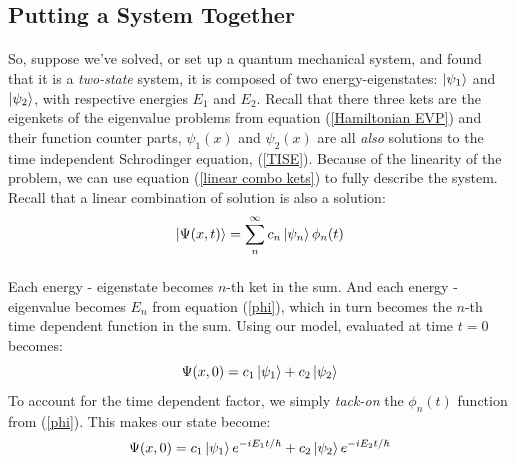 \documentclass[12pt,letterpaper]{book}
\begin{document}

\subsection*{Putting a System Together}
\paragraph*{}So, suppose we've solved, or set up a quantum mechanical system, and found that it is a \textit{two-state} system, it is composed of two energy-eigenstates: 
$\ket{\psi_1}$ and $\ket{\psi_2}$, with respective energies $E_1$ and $E_2$.  Recall that there three kets are the eigenkets of the eigenvalue problems from equation (\ref{Hamiltonian EVP}) and their function counter parts, $\psi_1(x)$ and $\psi_2(x)$ are all \textit{also} solutions to the time independent Schrodinger equation, (\ref{TISE}). Because of the linearity of the problem, we can use equation (\ref{linear combo kets}) to fully describe the system. Recall that a linear combination of solution is also a solution:
\begin{equation}
\ket{\Psi(x,t)} = \sum_n^{\infty} c_n \ket{\psi_n} \phi_n(t)
\end{equation}
\paragraph*{}Each energy - eigenstate becomes $n$-th ket in the sum. And each energy - eigenvalue becomes $E_n$ from equation (\ref{phi}), which in turn becomes the $n$-th time dependent function in the sum. Using our model, evaluated at time $t=0$ becomes:
\begin{equation}
\Psi(x,0) = c_1 \ket{\psi_1} + c_2 \ket{\psi_2} 
\end{equation}
To account for the time dependent factor, we simply \textit{tack-on} the $\phi_n(t)$ function from (\ref{phi}). This makes our state become:
\begin{equation}
\Psi(x,0) = c_1 \ket{\psi_1}e^{-iE_1t/\hbar} + c_2 \ket{\psi_2} e^{-iE_2t/\hbar}
\end{equation}
\end{document}
